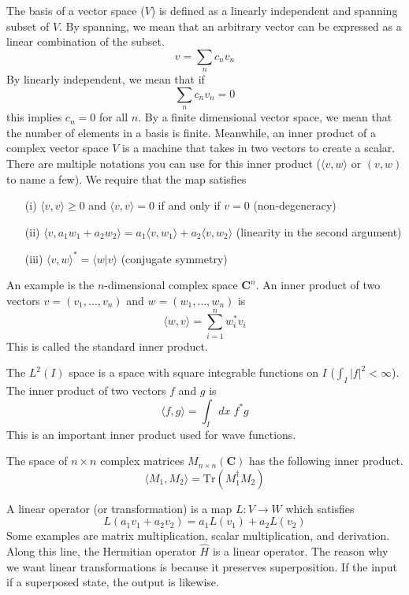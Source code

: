 \begin{defi}
The basis of a vector space ($V$) is defined as a linearly independent and spanning subset of $V$. By spanning, we mean that an arbitrary vector can be expressed as a linear combination of the subset.
\[v=\sum _{n}c_{n}v_{n}\]
By linearly independent, we mean that if 
\[\sum _{n}c_{n}v_{n}=0\]
	this implies $c_{n}=0$ for all $n$. By a finite dimensional vector space, we mean that the number of elements in a basis is finite. Meanwhile, an inner product of a complex vector space $V$ is a machine that takes in two vectors to create a scalar. There are multiple notations you can use for this inner product ($\langle v,w\rangle $ or $(v,w)$ to name a few). We require that the map satisfies
\begin{itemize}
	\item[(i)] $\langle v,v\rangle \geq 0$ and $\langle v,v\rangle =0$ if and only if $v=0$ (non-degeneracy)
	\item[(ii)] $\langle v,a_1w_1+a_2w_2\rangle =a_1\langle v,w_1\rangle+a_2\langle v,w_2\rangle  $ (linearity in the second argument)
	\item[(iii)] $\langle v,w\rangle ^{*}=\langle w|v\rangle $ (conjugate symmetry)
\end{itemize}
\end{defi}
\vspace{2ex}
\begin{ex}
An example is the $n$-dimensional complex space ${\bm C}^{n}$. An inner product of two vectors $v=(v_1,\ldots ,v_{n})$ and $w=(w_1,\ldots ,w_{n})$ is
\[\langle w,v\rangle =\sum ^{n}_{i=1}w_{i}^{*}v_{i}\]
This is called the standard inner product. 
\end{ex}
\vspace{2ex}
\begin{ex}
The $L^{2}(I)$ space is a space with square integrable functions on $I$ ($\int _{I}|f|^2<\infty $). The inner product of two vectors $f$ and $g$ is
\[\langle f,g\rangle =\int_{I} dx\;f^{*}g\]
This is an important inner product used for wave functions.
\end{ex}
\vspace{2ex}
\begin{ex}
The space of $n\times n$ complex matrices $M_{n\times n}({\bm C})$ has the following inner product.
\[\langle M_1,M_2\rangle =\mathrm{Tr}(M_1^{\dagger}M_2)\]
\end{ex}
\vspace{2ex}
\begin{defi}
A linear operator (or transformation) is a map $L:V\rightarrow W$ which satisfies
\[L(a_1v_1+a_2v_2)=a_1L(v_1)+a_2L(v_2)\]
Some examples are matrix multiplication, scalar multiplication, and derivation. Along this line, the Hermitian operator $\hat{H}$ is a linear operator. The reason why we want linear transformations is because it preserves superposition. If the input if a superposed state, the output is likewise.
\end{defi}
